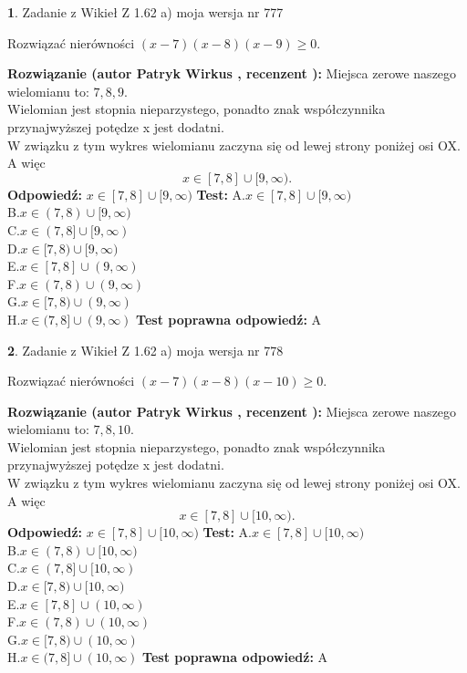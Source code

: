 \documentclass[12pt, a4paper]{article}
\theoremstyle{definition} %
\newtheorem{zad}{}
\newcommand{\zadStart}[1]{\begin{zad}#1\newline}
\newcommand{\zadStop}{\end{zad}}
\newcommand{\rozwStart}[2]{\noindent \textbf{Rozwiązanie (autor #1 , recenzent #2): }\newline}
\newcommand{\rozwStop}{\newline}
\newcommand{\odpStart}{\noindent \textbf{Odpowiedź:}\newline}
\newcommand{\odpStop}{\newline}
\newcommand{\testStart}{\noindent \textbf{Test:}\newline}
\newcommand{\testStop}{\newline}
\newcommand{\kluczStart}{\noindent \textbf{Test poprawna odpowiedź:}\newline}
\newcommand{\kluczStop}{\newline}
\begin{document}
\zadStart{Zadanie z Wikieł Z 1.62 a) moja wersja nr 777}

Rozwiązać nierówności $(x-7)(x-8)(x-9)\ge0$.
\zadStop
\rozwStart{Patryk Wirkus}{}
Miejsca zerowe naszego wielomianu to: $7, 8, 9$.\\
Wielomian jest stopnia nieparzystego, ponadto znak współczynnika przy\linebreak najwyższej potędze x jest dodatni.\\ W związku z tym wykres wielomianu zaczyna się od lewej strony poniżej osi OX. A więc $$x \in [7,8] \cup [9,\infty).$$
\rozwStop
\odpStart
$x \in [7,8] \cup [9,\infty)$
\odpStop
\testStart
A.$x \in [7,8] \cup [9,\infty)$\\
B.$x \in (7,8) \cup [9,\infty)$\\
C.$x \in (7,8] \cup [9,\infty)$\\
D.$x \in [7,8) \cup [9,\infty)$\\
E.$x \in [7,8] \cup (9,\infty)$\\
F.$x \in (7,8) \cup (9,\infty)$\\
G.$x \in [7,8) \cup (9,\infty)$\\
H.$x \in (7,8] \cup (9,\infty)$
\testStop
\kluczStart
A
\kluczStop



\zadStart{Zadanie z Wikieł Z 1.62 a) moja wersja nr 778}

Rozwiązać nierówności $(x-7)(x-8)(x-10)\ge0$.
\zadStop
\rozwStart{Patryk Wirkus}{}
Miejsca zerowe naszego wielomianu to: $7, 8, 10$.\\
Wielomian jest stopnia nieparzystego, ponadto znak współczynnika przy\linebreak najwyższej potędze x jest dodatni.\\ W związku z tym wykres wielomianu zaczyna się od lewej strony poniżej osi OX. A więc $$x \in [7,8] \cup [10,\infty).$$
\rozwStop
\odpStart
$x \in [7,8] \cup [10,\infty)$
\odpStop
\testStart
A.$x \in [7,8] \cup [10,\infty)$\\
B.$x \in (7,8) \cup [10,\infty)$\\
C.$x \in (7,8] \cup [10,\infty)$\\
D.$x \in [7,8) \cup [10,\infty)$\\
E.$x \in [7,8] \cup (10,\infty)$\\
F.$x \in (7,8) \cup (10,\infty)$\\
G.$x \in [7,8) \cup (10,\infty)$\\
H.$x \in (7,8] \cup (10,\infty)$
\testStop
\kluczStart
A
\kluczStop
\end{document}
